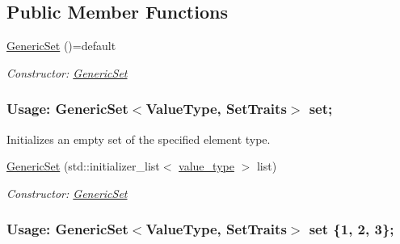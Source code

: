 \subsection*{Public Member Functions}
\begin{DoxyCompactItemize}
\item 
\mbox{\hyperlink{classstanfordcpplib_1_1collections_1_1GenericSet_a509ac9cd7429d3187594beced88d4921}{Generic\+Set}} ()=default
\begin{DoxyCompactList}\small\item\em Constructor\+: \mbox{\hyperlink{classstanfordcpplib_1_1collections_1_1GenericSet}{Generic\+Set}} \subsubsection*{Usage\+: Generic\+Set$<$\+Value\+Type, Set\+Traits$>$ set; }

Initializes an empty set of the specified element type. \end{DoxyCompactList}\item 
\mbox{\hyperlink{classstanfordcpplib_1_1collections_1_1GenericSet_a6bac19c4194012a2724702caf3a15e20}{Generic\+Set}} (std\+::initializer\+\_\+list$<$ \mbox{\hyperlink{classstanfordcpplib_1_1collections_1_1GenericSet_a669c81f158766925e7293f97c0099b28}{value\+\_\+type}} $>$ list)
\begin{DoxyCompactList}\small\item\em Constructor\+: \mbox{\hyperlink{classstanfordcpplib_1_1collections_1_1GenericSet}{Generic\+Set}} \subsubsection*{Usage\+: Generic\+Set$<$\+Value\+Type, Set\+Traits$>$ set \{1, 2, 3\}; }


\end{DoxyCompactList}
\end{DoxyCompactItemize}
